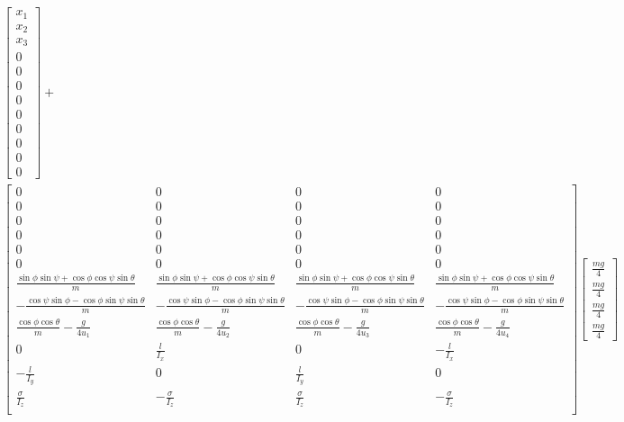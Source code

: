 \documentclass{article}
\begin{document}
\begin{equation}
\begin{aligned}
        \begin{bmatrix}
            x_1 \\ x_2 \\ x_3 \\ 0 \\ 0 \\ 0 \\
            0 \\ 0 \\ 0 \\ 0 \\ 0 \\ 0
        \end{bmatrix}
        + \\
        \begin{bmatrix}
            0 & 0 & 0 & 0 \\
            0 & 0 & 0 & 0 \\
            0 & 0 & 0 & 0 \\
            0 & 0 & 0 & 0 \\
            0 & 0 & 0 & 0 \\
            0 & 0 & 0 & 0 \\
            \frac{\sin{\phi}\sin{\psi}+\cos{\phi}\cos{\psi}\sin{\theta}}{m} & \frac{\sin{\phi}\sin{\psi}+\cos{\phi}\cos{\psi}\sin{\theta}}{m} & \frac{\sin{\phi}\sin{\psi}+\cos{\phi}\cos{\psi}\sin{\theta}}{m} & \frac{\sin{\phi}\sin{\psi}+\cos{\phi}\cos{\psi}\sin{\theta}}{m} \\
            -\frac{\cos{\psi}\sin{\phi}-\cos{\phi}\sin{\psi}\sin{\theta}}{m} & -\frac{\cos{\psi}\sin{\phi}-\cos{\phi}\sin{\psi}\sin{\theta}}{m} & -\frac{\cos{\psi}\sin{\phi}-\cos{\phi}\sin{\psi}\sin{\theta}}{m} & -\frac{\cos{\psi}\sin{\phi}-\cos{\phi}\sin{\psi}\sin{\theta}}{m} \\
            \frac{\cos{\phi}\cos{\theta}}{m}-\frac{g}{4u_1} & \frac{\cos{\phi}\cos{\theta}}{m}-\frac{g}{4u_2} & \frac{\cos{\phi}\cos{\theta}}{m}-\frac{g}{4u_3} & \frac{\cos{\phi}\cos{\theta}}{m}-\frac{g}{4u_4} \\
            0 & \frac{l}{I_x} & 0 & -\frac{l}{I_x} \\
            -\frac{l}{I_y} & 0 & \frac{l}{I_y} & 0 \\
            \frac{\sigma}{I_z} & -\frac{\sigma}{I_z} & \frac{\sigma}{I_z} & -\frac{\sigma}{I_z} \\
        \end{bmatrix}
        \begin{bmatrix}
            \frac{mg}{4} \\ \frac{mg}{4} \\ \frac{mg}{4} \\ \frac{mg}{4}
        \end{bmatrix}
    \end{aligned}
\end{equation}
\end{document}
